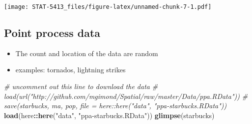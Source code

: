\documentclass[]{book}
\newenvironment{Shaded}{\begin{snugshade}}{\end{snugshade}}
\newcommand{\CommentTok}[1]{\textcolor[rgb]{0.56,0.35,0.01}{\textit{#1}}}
\newcommand{\DataTypeTok}[1]{\textcolor[rgb]{0.13,0.29,0.53}{#1}}
\newcommand{\FloatTok}[1]{\textcolor[rgb]{0.00,0.00,0.81}{#1}}
\newcommand{\KeywordTok}[1]{\textcolor[rgb]{0.13,0.29,0.53}{\textbf{#1}}}
\newcommand{\NormalTok}[1]{#1}
\newcommand{\OperatorTok}[1]{\textcolor[rgb]{0.81,0.36,0.00}{\textbf{#1}}}
\newcommand{\StringTok}[1]{\textcolor[rgb]{0.31,0.60,0.02}{#1}}
\providecommand{\tightlist}{%
  \setlength{\itemsep}{0pt}\setlength{\parskip}{0pt}}
\begin{document}
\begin{Shaded}
\end{Shaded}

\texttt{[image: STAT-5413\_files/figure-latex/unnamed-chunk-7-1.pdf]}

\hypertarget{point-process-data}{%
\subsection{Point process data}\label{point-process-data}}

\begin{itemize}
\tightlist
\item
  The count and location of the data are random
\item
  examples: tornados, lightning strikes
\end{itemize}

\begin{Shaded}
\begin{Highlighting}[]
\CommentTok{# uncomment out this line to download the data}
\CommentTok{# load(url("http://github.com/mgimond/Spatial/raw/master/Data/ppa.RData"))}
\CommentTok{# save(starbucks, ma, pop, file = here::here("data", "ppa-starbucks.RData"))}
\KeywordTok{load}\NormalTok{(here}\OperatorTok{::}\KeywordTok{here}\NormalTok{(}\StringTok{"data"}\NormalTok{, }\StringTok{"ppa-starbucks.RData"}\NormalTok{))}
\KeywordTok{glimpse}\NormalTok{(starbucks)}
\end{Highlighting}
\end{Shaded}
\end{document}
